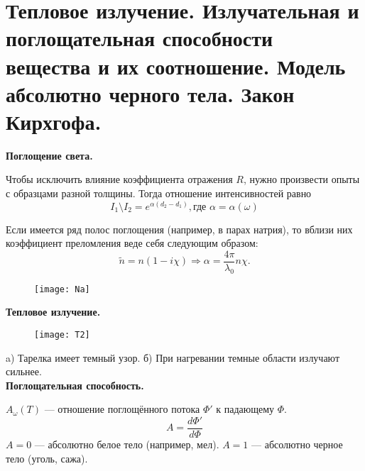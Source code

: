 \section{Тепловое излучение. Излучательная и поглощательная способности вещества и их соотношение. Модель абсолютно черного тела. Закон Кирхгофа.}

\textbf{Поглощение света.}


Чтобы исключить влияние коэффициента отражения $R$, нужно произвести опыты с образцами разной толщины. Тогда отношение интенсивностей равно $$I_1\setminus I_2 = e^{\alpha(d_2-d_1)}, \mbox{где } \alpha = \alpha(\omega)$$


Если имеется ряд полос поглощения (например, в парах натрия), то вблизи них коэффициент преломления веде себя следующим образом:
$$\tilde{n} = n(1 - i\chi) \Rightarrow \alpha = \frac{4\pi}{\lambda_0}n\chi.$$
\begin{figure}[H]
	\centering
	\texttt{[image: Na]}
\end{figure}
\newpage
\textbf{Тепловое излучение.}


\begin{figure}[H]
	\centering
	\texttt{[image: T2]}
\end{figure}

a) Тарелка имеет темный узор.
б) При нагревании темные области излучают сильнее.
$$$$
\textbf{Поглощательная способность.}

$A_\omega (T)$ --- отношение поглощённого потока $\Phi'$ к падающему $\Phi$.
$$A = \frac{d\Phi'}{d\Phi}$$
$A = 0$ --- абсолютно белое тело (например, мел).
$A = 1$ --- абсолютно черное тело (уголь, сажа).


